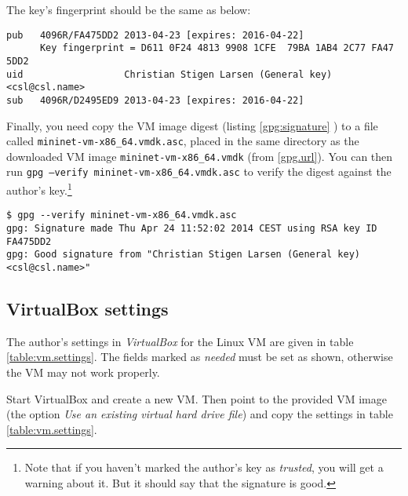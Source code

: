 The key's fingerprint should be the same as below:

\begin{lstlisting}[label={gpg:key.fingerprint}]
pub   4096R/FA475DD2 2013-04-23 [expires: 2016-04-22]
      Key fingerprint = D611 0F24 4813 9908 1CFE  79BA 1AB4 2C77 FA47 5DD2
uid                  Christian Stigen Larsen (General key) <csl@csl.name>
sub   4096R/D2495ED9 2013-04-23 [expires: 2016-04-22]
\end{lstlisting}

Finally, you need copy the VM image digest (listing \ref{gpg:signature}
) to a file called
\texttt{mininet-vm-x86\_{}64.vmdk.asc}, placed in the same directory as the
downloaded VM image \texttt{mininet-vm-x86\_{}64.vmdk} (from \vref{gpg.url}).
You can then run \texttt{gpg --verify mininet-vm-x86\_{}64.vmdk.asc} to verify
the digest against the author's key.\footnote{Note that if you haven't
marked the author's key as \textit{trusted}, you will get a warning about
it.  But it should say that the signature is good.}

\begin{lstlisting}[label={gpg:key.fingerprint}]
$ gpg --verify mininet-vm-x86_64.vmdk.asc
gpg: Signature made Thu Apr 24 11:52:02 2014 CEST using RSA key ID FA475DD2
gpg: Good signature from "Christian Stigen Larsen (General key) <csl@csl.name>"
\end{lstlisting}




\clearpage

\subsection{VirtualBox settings}

The author's settings in \textit{VirtualBox}
for the Linux VM are given in table
\vref{table:vm.settings}.  The fields marked as \textit{needed} must be set
as shown, otherwise the VM may not work properly.

Start VirtualBox and create a new VM.  Then point to the provided VM image
(the option \textit{Use an existing virtual hard drive file})
and copy the settings in table \vref{table:vm.settings}.


